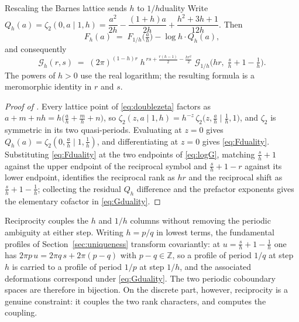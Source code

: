 \documentclass[11pt,letterpaper]{article}
\newcommand{\Gc}{\mathcal{G}}               %
\newcommand{\Fh}{F_h}
\newcommand{\Zt}{\zeta_2}
\newcommand{\Zint}{\mathbb{Z}}
\begin{document}
\begin{theorem}{Rescaling the Barnes lattice sends $h$ to $1/h$}{duality}
Write $Q_h(a)=\Zt(0,a\mid 1,h)=\dfrac{a^{2}}{2h}-\dfrac{(1+h)a}{2h}
+\dfrac{h^{2}+3h+1}{12h}$. Then
\begin{equation}
  \Fh(a)\;=\;F_{1/h}\!\bigl(\tfrac{a}{h}\bigr)-\log h\cdot Q_h(a),
  \label{eq:Fduality}
\end{equation}
and consequently
\begin{equation}
  \Gc_h(r,s)\;=\;(2\pi)^{(1-h)r}\;
  h^{\,rs+\frac{r(h-1)}{2}-\frac{h r^{2}}{2}}\;
  \Gc_{1/h}\!\bigl(hr,\;\tfrac{s}{h}+1-\tfrac1h\bigr).
  \label{eq:Gduality}
\end{equation}
The powers of $h>0$ use the real logarithm; the resulting formula is a
meromorphic identity in $r$ and $s$.
\end{theorem}

\begin{proof}[Proof of ]
Every lattice point of \eqref{eq:doublezeta} factors as
$a+m+nh=h\bigl(\tfrac{a}{h}+\tfrac{m}{h}+n\bigr)$, so
$\Zt(z,a\mid1,h)=h^{-z}\,\Zt\bigl(z,\tfrac{a}{h}\mid \tfrac1h,1\bigr)$, and
$\Zt$ is symmetric in its two quasi-periods. Evaluating at $z=0$ gives
$Q_h(a)=\Zt(0,\tfrac{a}{h}\mid1,\tfrac1h)$, and differentiating at $z=0$ gives
\eqref{eq:Fduality}. Substituting \eqref{eq:Fduality} at the two endpoints of
\eqref{eq:logG}, matching $\tfrac{s}{h}+1$ against the upper endpoint of the
reciprocal symbol and $\tfrac{s}{h}+1-r$ against its lower endpoint, identifies
the reciprocal rank as $hr$ and the reciprocal shift as $\tfrac{s}{h}+1-\tfrac1h$;
collecting the residual $Q_h$ difference and the prefactor exponents gives the
elementary cofactor in \eqref{eq:Gduality}.
\end{proof}

\begin{remark}
\label{rem:duality-scope}
Reciprocity couples the $h$ and $1/h$ columns without removing the periodic
ambiguity at either step. Writing $h=p/q$ in lowest terms, the fundamental profiles of
Section~\ref{sec:uniqueness} transform covariantly: at
$u=\tfrac{s}{h}+1-\tfrac1h$ one has $2\pi p\,u=2\pi q\,s+2\pi(p-q)$ with
$p-q\in\Zint$, so a profile of period $1/q$ at step $h$ is carried to a profile
of period $1/p$ at step $1/h$, and the associated deformations correspond under
\eqref{eq:Gduality}. The two periodic coboundary spaces are therefore in
bijection. On the discrete part, however, reciprocity is a genuine constraint:
it couples the two rank characters, and  computes the
coupling.
\end{remark}
\end{document}
